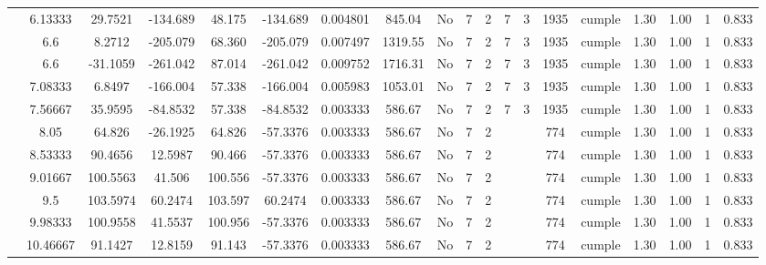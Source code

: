 \begin{table}[H]
{\begin{tabular}{|c|c|c|c|c|c|r|c|c|c|c|c|c|c|c|c|c|c|c|}
\cline{2-19}    & 6.13333 & 29.7521 & -134.689 & 48.175 & -134.689 & 0.004801 & 845.04 & No  & 7   & 2   & 7   & 3   & 1935 & \cellcolor[rgb]{ .776,  .937,  .808}cumple & 1.30 & 1.00 & 1   & 0.833 \bigstrut\\
\cline{2-19}    & \cellcolor[rgb]{ .851,  .882,  .949}6.6 & 8.2712 & -205.079 & 68.360 & -205.079 & 0.007497 & 1319.55 & No  & 7   & 2   & 7   & 3   & 1935 & \cellcolor[rgb]{ .776,  .937,  .808}cumple & 1.30 & 1.00 & 1   & 0.833 \bigstrut\\
\cline{2-19}    & \cellcolor[rgb]{ .851,  .882,  .949}6.6 & -31.1059 & -261.042 & 87.014 & -261.042 & 0.009752 & 1716.31 & No  & 7   & 2   & 7   & 3   & 1935 & \cellcolor[rgb]{ .776,  .937,  .808}cumple & 1.30 & 1.00 & 1   & 0.833 \bigstrut\\
\cline{2-19}    & 7.08333 & 6.8497 & -166.004 & 57.338 & -166.004 & 0.005983 & 1053.01 & No  & 7   & 2   & 7   & 3   & 1935 & \cellcolor[rgb]{ .776,  .937,  .808}cumple & 1.30 & 1.00 & 1   & 0.833 \bigstrut\\
\cline{2-19}    & 7.56667 & 35.9595 & -84.8532 & 57.338 & -84.8532 & 0.003333 & 586.67 & No  & 7   & 2   & 7   & 3   & 1935 & \cellcolor[rgb]{ .776,  .937,  .808}cumple & 1.30 & 1.00 & 1   & 0.833 \bigstrut\\
\cline{2-19}    & 8.05 & 64.826 & -26.1925 & 64.826 & -57.3376 & 0.003333 & 586.67 & No  & 7   & 2   &     &     & 774 & \cellcolor[rgb]{ .776,  .937,  .808}cumple & 1.30 & 1.00 & 1   & 0.833 \bigstrut\\
\cline{2-19}    & 8.53333 & 90.4656 & 12.5987 & 90.466 & -57.3376 & 0.003333 & 586.67 & No  & 7   & 2   &     &     & 774 & \cellcolor[rgb]{ .776,  .937,  .808}cumple & 1.30 & 1.00 & 1   & 0.833 \bigstrut\\
\cline{2-19}    & 9.01667 & 100.5563 & 41.506 & 100.556 & -57.3376 & 0.003333 & 586.67 & No  & 7   & 2   &     &     & 774 & \cellcolor[rgb]{ .776,  .937,  .808}cumple & 1.30 & 1.00 & 1   & 0.833 \bigstrut\\
\cline{2-19}    & 9.5 & 103.5974 & 60.2474 & 103.597 & 60.2474 & 0.003333 & 586.67 & No  & 7   & 2   &     &     & 774 & \cellcolor[rgb]{ .776,  .937,  .808}cumple & 1.30 & 1.00 & 1   & 0.833 \bigstrut\\
\cline{2-19}    & 9.98333 & 100.9558 & 41.5537 & 100.956 & -57.3376 & 0.003333 & 586.67 & No  & 7   & 2   &     &     & 774 & \cellcolor[rgb]{ .776,  .937,  .808}cumple & 1.30 & 1.00 & 1   & 0.833 \bigstrut\\
\cline{2-19}    & 10.46667 & 91.1427 & 12.8159 & 91.143 & -57.3376 & 0.003333 & 586.67 & No  & 7   & 2   &     &     & 774 & \cellcolor[rgb]{ .776,  .937,  .808}cumple & 1.30 & 1.00 & 1   & 0.833 \bigstrut\\

\end{tabular}}
\end{table}
